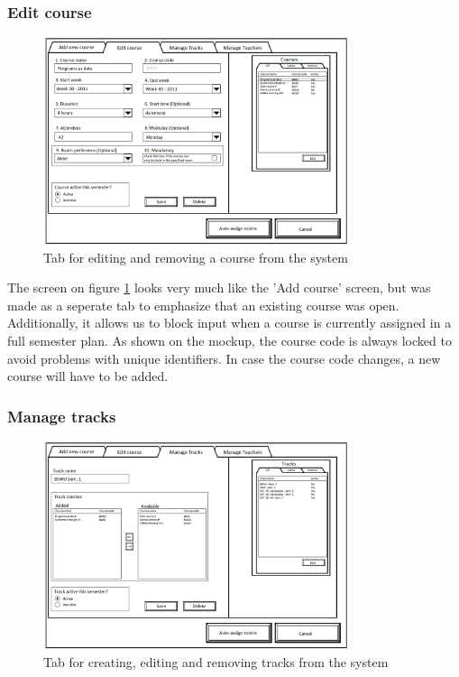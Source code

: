 \subsubsection{Edit course}
\begin{figure}[htb]
\begin{center}
\leavevmode
\includegraphics[width=0.8\textwidth]{images/courseplan2_editcourse}
\end{center}
\caption{Tab for editing and removing a course from the system}
\label{fig:courseplan2_editcourse}
\end{figure}

The screen on figure \ref{fig:courseplan2_editcourse} looks very much like the 'Add course' screen, but was made as a seperate tab to emphasize that an existing course was open. Additionally, it allows us to block input when a course is currently assigned in a full semester plan. As shown on the mockup, the course code is always locked to avoid problems with unique identifiers. In case the course code changes, a new course will have to be added.

\subsubsection{Manage tracks}
\begin{figure}[htb]
\begin{center}
\leavevmode
\includegraphics[width=0.8\textwidth]{images/courseplan2_managetracks}
\end{center}
\caption{Tab for creating, editing and removing tracks from the system}
\label{fig:courseplan2_managetracks}
\end{figure}

